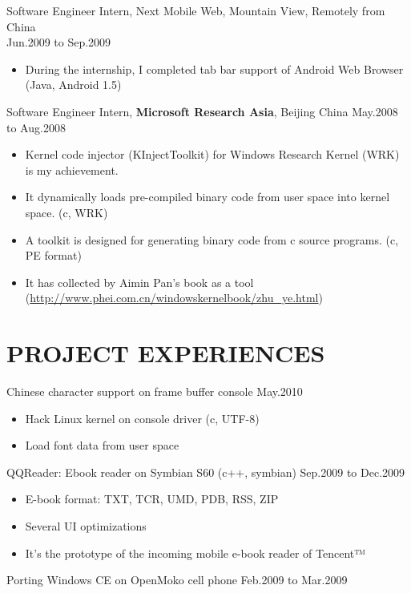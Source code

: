 \documentclass[11pt]{res} %
\begin{document}
\begin{resume}
Software Engineer Intern, Next Mobile Web, Mountain View, Remotely from China \\
\hspace*{\fill} Jun.2009 to Sep.2009
\begin{itemize} \itemsep -2pt
\item During the internship, I completed tab bar support of Android Web Browser (Java, Android 1.5)
\end{itemize} 

Software Engineer Intern, \textbf{Microsoft Research Asia}, Beijing China \hfill May.2008 to Aug.2008
\begin{itemize} \itemsep -2pt
\item Kernel code injector (KInjectToolkit) for Windows Research Kernel (WRK) is my achievement.
\item It dynamically loads pre-compiled binary code from user space into kernel space. (c, WRK)
\item A toolkit is designed for generating binary code from c source programs. (c, PE format)
\item It has collected by Aimin Pan's book as a tool
  (\href{http://www.phei.com.cn/windowskernelbook/zhu\_ye.html}{http://www.phei.com.cn/windowskernelbook/zhu\_ye.html})
\end{itemize} 

\section{PROJECT EXPERIENCES}
Chinese character support on frame buffer console \hfill May.2010

\begin{itemize} \itemsep -2pt
\item Hack Linux kernel on console driver (c, UTF-8)
\item Load font data from user space
\end{itemize}

QQReader: Ebook reader on Symbian S60  (c++, symbian) \hfill Sep.2009 to Dec.2009

\begin{itemize} \itemsep -2pt
\item E-book format: TXT, TCR, UMD, PDB, RSS, ZIP
\item Several UI optimizations
\item It's the prototype of the incoming mobile e-book reader of Tencent™
\end{itemize}

Porting Windows CE on OpenMoko cell phone \hfill Feb.2009 to Mar.2009


\end{resume}
\end{document}
